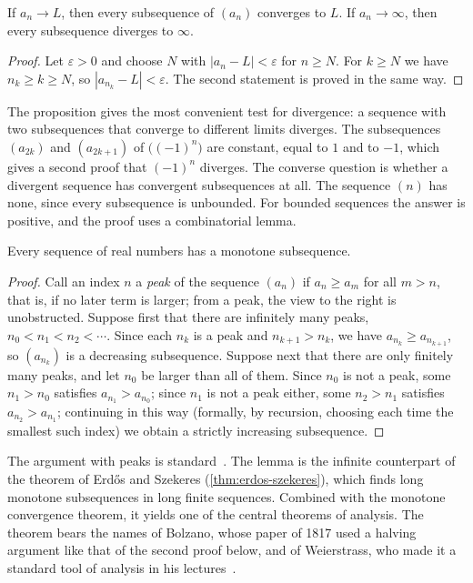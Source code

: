 \begin{proposition}
\label{prop:subsequence}
If $a_n\to L$, then every subsequence of $(a_n)$ converges to $L$. If $a_n\to\infty$, then every subsequence diverges to $\infty$.
\end{proposition}

\begin{proof}
Let $\varepsilon>0$ and choose $N$ with $|a_n-L|<\varepsilon$ for $n\ge N$. For $k\ge N$ we have $n_k\ge k\ge N$, so $|a_{n_k}-L|<\varepsilon$. The second statement is proved in the same way.
\end{proof}

The proposition gives the most convenient test for divergence: a sequence with two subsequences that converge to different limits diverges. The subsequences $(a_{2k})$ and $(a_{2k+1})$ of $\bigl((-1)^n\bigr)$ are constant, equal to $1$ and to $-1$, which gives a second proof that $(-1)^n$ diverges. The converse question is whether a divergent sequence has convergent subsequences at all. The sequence $(n)$ has none, since every subsequence is unbounded. For bounded sequences the answer is positive, and the proof uses a combinatorial lemma.

\begin{lemma}
\label{lem:monotone-subsequence}
Every sequence of real numbers has a monotone subsequence.
\end{lemma}

\begin{proof}
Call an index $n$ a \emph{peak} of the sequence $(a_n)$ if $a_n\ge a_m$ for all $m>n$, that is, if no later term is larger; from a peak, the view to the right is unobstructed. Suppose first that there are infinitely many peaks, $n_0<n_1<n_2<\cdots$. Since each $n_k$ is a peak and $n_{k+1}>n_k$, we have $a_{n_k}\ge a_{n_{k+1}}$, so $(a_{n_k})$ is a decreasing subsequence. Suppose next that there are only finitely many peaks, and let $n_0$ be larger than all of them. Since $n_0$ is not a peak, some $n_1>n_0$ satisfies $a_{n_1}>a_{n_0}$; since $n_1$ is not a peak either, some $n_2>n_1$ satisfies $a_{n_2}>a_{n_1}$; continuing in this way (formally, by recursion, choosing each time the smallest such index) we obtain a strictly increasing subsequence.
\end{proof}

The argument with peaks is standard~\cite{bartle2011}. The lemma is the infinite counterpart of the theorem of Erd\H{o}s and Szekeres (\cref{thm:erdos-szekeres}), which finds long monotone subsequences in long finite sequences. Combined with the monotone convergence theorem, it yields one of the central theorems of analysis. The theorem bears the names of Bolzano, whose paper of 1817 used a halving argument like that of the second proof below, and of Weierstrass, who made it a standard tool of analysis in his lectures~\cite{russ1980,hairer1996analysis}.

